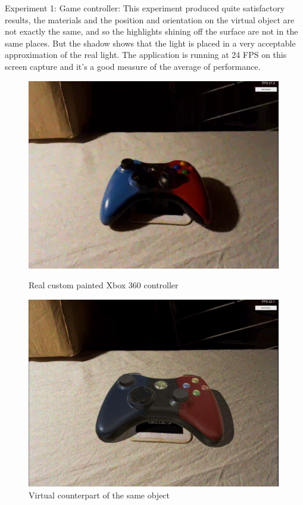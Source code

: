 Experiment 1: Game controller:  This experiment produced quite satisfactory results, the materials and the position and orientation on the virtual object are not exactly the same, and so the highlights shining off the surface are not in the same places. But the shadow shows that the light is placed in a very acceptable approximation of the real light. The application is running at 24 FPS on this screen capture and it's a good measure of the average of performance. 
\begin{figure}[H]
    \centering
    \begin{minipage}{0.475\textwidth}
        \centering
        \includegraphics[width=0.99\textwidth]{Figures/ContReal.png} %
        \caption{Real custom painted Xbox 360 controller}
    \end{minipage}\hfill
    \begin{minipage}{0.475\textwidth}
        \centering
        \includegraphics[width=0.99\textwidth]{Figures/ContVirtual.png} %
        \caption{Virtual counterpart of the same object}
    \end{minipage}
\end{figure}

